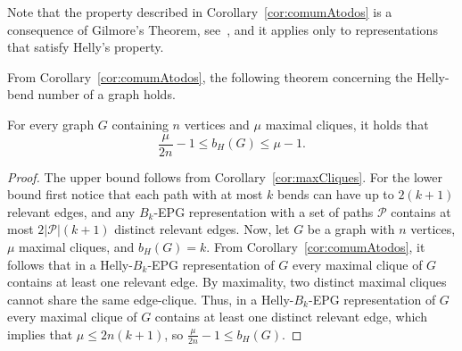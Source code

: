 Note that the property described in Corollary~\ref{cor:comumAtodos} is a consequence of Gilmore's Theorem, see~\cite{bergeDuchet1975}, and it applies only to representations that satisfy Helly's property.

From Corollary~\ref{cor:comumAtodos}, the following theorem concerning the Helly-bend number of a graph holds.

\begin{theorem}\label{teo:lowerboundCliques}
For every graph $G$ containing $n$ vertices and $\mu$ maximal cliques, it holds that $$\frac{\mu}{2n}-1\leq b_H(G)\leq \mu -1.$$ 
\end{theorem}
\begin{proof}
The upper bound follows from Corollary~\ref{cor:maxCliques}.
For the lower bound first notice that each path with at most $k$ bends can have up to $2(k + 1)$ relevant edges, and any $B_k$-EPG representation with a set of paths $\mathcal{P}$ contains at most $2|\mathcal{P}|(k + 1)$ distinct relevant edges. Now, let $G$ be a graph with $n$ vertices, $\mu$ maximal cliques, and $b_H(G)=k$. From Corollary~\ref{cor:comumAtodos}, it follows that in a Helly-$B_k$-EPG representation of $G$ every maximal clique of $G$ contains at least one relevant edge. By maximality, two distinct maximal cliques cannot share the same edge-clique. Thus, in a Helly-$B_k$-EPG representation of $G$ every maximal clique of $G$ contains at least one distinct relevant edge, which implies that $\mu\leq 2n(k+1)$, so $\frac{\mu}{2n}-1\leq b_H(G)$.
\end{proof}


